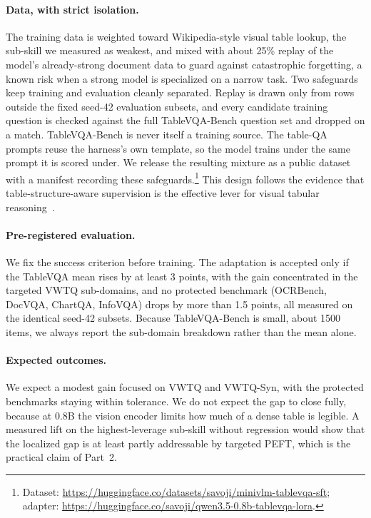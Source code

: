 \documentclass{article}
\begin{document}
\paragraph{Data, with strict isolation.}
The training data is weighted toward Wikipedia-style visual table lookup, the
sub-skill we measured as weakest, and mixed with about 25\% replay of the model's
already-strong document data to guard against catastrophic forgetting, a known
risk when a strong model is specialized on a narrow task. Two safeguards keep
training and evaluation cleanly separated. Replay is drawn only from rows outside
the fixed seed-42 evaluation subsets, and every candidate training question is
checked against the full TableVQA-Bench question set and dropped on a match.
TableVQA-Bench is never itself a training source. The table-QA prompts reuse the
harness's own template, so the model trains under the same prompt it is scored
under. We release the resulting mixture as a public dataset with a manifest
recording these safeguards.\footnote{Dataset:
\url{https://huggingface.co/datasets/savoji/minivlm-tablevqa-sft}; adapter:
\url{https://huggingface.co/savoji/qwen3.5-0.8b-tablevqa-lora}.} This design follows the
evidence that table-structure-aware supervision is the effective lever for
visual tabular reasoning~\citep{zheng2024mmtab}.

\paragraph{Pre-registered evaluation.}
We fix the success criterion before training. The adaptation is accepted only if
the TableVQA mean rises by at least 3 points, with the gain concentrated in the
targeted VWTQ sub-domains, and no protected benchmark (OCRBench, DocVQA, ChartQA,
InfoVQA) drops by more than 1.5 points, all measured on the identical seed-42
subsets. Because TableVQA-Bench is small, about 1500 items, we always report the
sub-domain breakdown rather than the mean alone.

\paragraph{Expected outcomes.}
We expect a modest gain focused on VWTQ and VWTQ-Syn, with the protected
benchmarks staying within tolerance. We do not expect the gap to close fully,
because at 0.8B the vision encoder limits how much of a dense table is legible. A
measured lift on the highest-leverage sub-skill without regression would show
that the localized gap is at least partly addressable by targeted PEFT, which is
the practical claim of Part~2.
\end{document}

